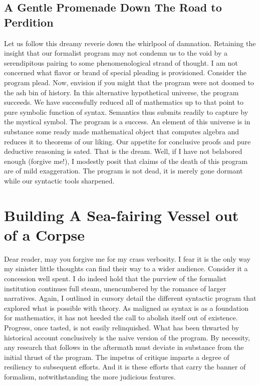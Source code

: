 \subsection{A Gentle Promenade Down The Road to Perdition}
Let us follow this dreamy reverie down the whirlpool of damnation. Retaining
the insight that our formalist program may not condemn us to the void by a
serendipitous pairing to some phenomenological strand of thought. I am not
concerned what flavor or brand of special pleading is provisioned. Consider the
program plead. Now, envision if you might that the program were not doomed to
the ash bin of history. In this alternative hypothetical universe, the program
succeeds. We have successfully reduced all of mathematics up to that point to
pure symbolic function of syntax. Semantics thus submits readily to capture by
the mystical symbol. The program is a success. An element of this universe is
in substance some ready made mathematical object that computes algebra and
reduces it to theorems of our liking. Our appetite for conclusive proofs and
pure deductive reasoning is sated. That is the dream. Well, if I have not
belabored enough (forgive me!), I modestly posit that claims of the death of
this program are of mild exaggeration. The program is not dead, it is merely
gone dormant while our syntactic tools sharpened.

\section{Building A Sea-fairing Vessel out of a Corpse}
Dear reader, may you forgive me for my crass verbosity. I fear it is the only
way my sinister little thoughts can find their way to a wider audience.
Consider it a concession well spent. I do indeed hold that the purview of the
formalist institution continues full steam, unencumbered by the romance of
larger narratives. Again, I outlined in cursory detail the different syntactic
program that explored what is possible with theory. As maligned as syntax is as
a foundation for mathematics, it has not heeded the call to abolish itself out
of existence. Progress, once tasted, is not easily relinquished. What has been
thwarted by historical account conclusively is the naive version of the
program. By necessity, any research that follows in the aftermath must deviate
in substance from the initial thrust of the program. The impetus of critique
imparts a degree of resiliency to subsequent efforts. And it is these efforts
that carry the banner of formalism, notwithstanding the more judicious
features.

